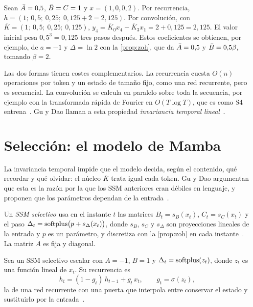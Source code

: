 \begin{ejemplo}\label{ej:ssm}
Sean $\bar{A}=0{,}5$, $\bar{B}=C=1$ y $x=(1,0,0,2)$. Por recurrencia, $h=(1;\ 0{,}5;\ 0{,}25;\ 0{,}125+2=2{,}125)$. Por convolución, con $\bar K=(1;\ 0{,}5;\ 0{,}25;\ 0{,}125)$, $y_4=\bar K_0x_4+\bar K_3x_1=2+0{,}125=2{,}125$. El valor inicial pesa $0{,}5^{3}=0{,}125$ tres pasos después. Estos coeficientes se obtienen, por ejemplo, de $a=-1$ y $\Delta=\ln 2$ con la \cref{prop:zoh}, que da $\bar{A}=0{,}5$ y $\bar{B}=0{,}5\beta$, tomando $\beta=2$.
\end{ejemplo}

Las dos formas tienen costes complementarios. La recurrencia cuesta $O(n)$ operaciones por token y un estado de tamaño fijo, como una red recurrente, pero es secuencial. La convolución se calcula en paralelo sobre toda la secuencia, por ejemplo con la transformada rápida de Fourier en $O(T\log T)$, que es como S4 entrena~\cite[§2.4]{s4}. Gu y Dao llaman a esta propiedad \emph{invariancia temporal lineal}~\cite[§2]{mamba}.

\section{Selección: el modelo de Mamba}

La invariancia temporal impide que el modelo decida, según el contenido, qué recordar y qué olvidar: el núcleo $\bar K$ trata igual cada token. Gu y Dao argumentan que esta es la razón por la que los SSM anteriores eran débiles en lenguaje, y proponen que los parámetros dependan de la entrada~\cite[§3.1 y §3.2]{mamba}.

\begin{definicion}\label{def:selectivo}
Un \emph{SSM selectivo} usa en el instante $t$ las matrices $B_t=s_B(x_t)$, $C_t=s_C(x_t)$ y el paso $\Delta_t=\operatorname{softplus}\bigl(p+s_\Delta(x_t)\bigr)$, donde $s_B$, $s_C$ y $s_\Delta$ son proyecciones lineales de la entrada y $p$ es un parámetro, y discretiza con la \cref{prop:zoh} en cada instante~\cite[§3.2, algoritmo~2]{mamba}. La matriz $A$ es fija y diagonal.
\end{definicion}

\begin{teorema}\label{teo:puerta}
Sea un SSM selectivo escalar con $A=-1$, $B=1$ y $\Delta_t=\operatorname{softplus}(z_t)$, donde $z_t$ es una función lineal de $x_t$. Su recurrencia es
\[
h_t=(1-g_t)\,h_{t-1}+g_t\,x_t,\qquad g_t=\sigma(z_t),
\]
la de una red recurrente con una puerta que interpola entre conservar el estado y sustituirlo por la entrada~\cite[§3.5.1, teorema~1]{mamba}.
\end{teorema}

